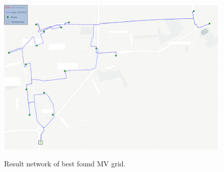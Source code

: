 \begin{figure}[h]
	\begin{centering}
		{\includegraphics[scale=0.5]{figures/experiments/1000_iter/pypsa_1000.png}}
		\caption{Result network of best found MV grid.}
		\label{fig:pypsa_1000}
	\end{centering}
\end{figure}
